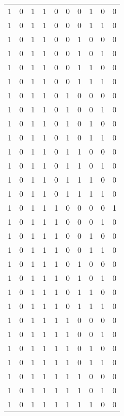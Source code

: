 \begin{longtable}[c]{rrrrrrrrrr}
        1 & 0 & 1 & 1 & 0 & 0 & 0 & 1 & 0 & 0 \\
        1 & 0 & 1 & 1 & 0 & 0 & 0 & 1 & 1 & 0 \\
        1 & 0 & 1 & 1 & 0 & 0 & 1 & 0 & 0 & 0 \\
        1 & 0 & 1 & 1 & 0 & 0 & 1 & 0 & 1 & 0 \\
        1 & 0 & 1 & 1 & 0 & 0 & 1 & 1 & 0 & 0 \\
        1 & 0 & 1 & 1 & 0 & 0 & 1 & 1 & 1 & 0 \\
        1 & 0 & 1 & 1 & 0 & 1 & 0 & 0 & 0 & 0 \\
        1 & 0 & 1 & 1 & 0 & 1 & 0 & 0 & 1 & 0 \\
        1 & 0 & 1 & 1 & 0 & 1 & 0 & 1 & 0 & 0 \\
        1 & 0 & 1 & 1 & 0 & 1 & 0 & 1 & 1 & 0 \\
        1 & 0 & 1 & 1 & 0 & 1 & 1 & 0 & 0 & 0 \\
        1 & 0 & 1 & 1 & 0 & 1 & 1 & 0 & 1 & 0 \\
        1 & 0 & 1 & 1 & 0 & 1 & 1 & 1 & 0 & 0 \\
        1 & 0 & 1 & 1 & 0 & 1 & 1 & 1 & 1 & 0 \\
        1 & 0 & 1 & 1 & 1 & 0 & 0 & 0 & 0 & 1 \\
        1 & 0 & 1 & 1 & 1 & 0 & 0 & 0 & 1 & 0 \\
        1 & 0 & 1 & 1 & 1 & 0 & 0 & 1 & 0 & 0 \\
        1 & 0 & 1 & 1 & 1 & 0 & 0 & 1 & 1 & 0 \\
        1 & 0 & 1 & 1 & 1 & 0 & 1 & 0 & 0 & 0 \\
        1 & 0 & 1 & 1 & 1 & 0 & 1 & 0 & 1 & 0 \\
        1 & 0 & 1 & 1 & 1 & 0 & 1 & 1 & 0 & 0 \\
        1 & 0 & 1 & 1 & 1 & 0 & 1 & 1 & 1 & 0 \\
        1 & 0 & 1 & 1 & 1 & 1 & 0 & 0 & 0 & 0 \\
        1 & 0 & 1 & 1 & 1 & 1 & 0 & 0 & 1 & 0 \\
        1 & 0 & 1 & 1 & 1 & 1 & 0 & 1 & 0 & 0 \\
        1 & 0 & 1 & 1 & 1 & 1 & 0 & 1 & 1 & 0 \\
        1 & 0 & 1 & 1 & 1 & 1 & 1 & 0 & 0 & 0 \\
        1 & 0 & 1 & 1 & 1 & 1 & 1 & 0 & 1 & 0 \\
        1 & 0 & 1 & 1 & 1 & 1 & 1 & 1 & 0 & 0 \\

\end{longtable}

